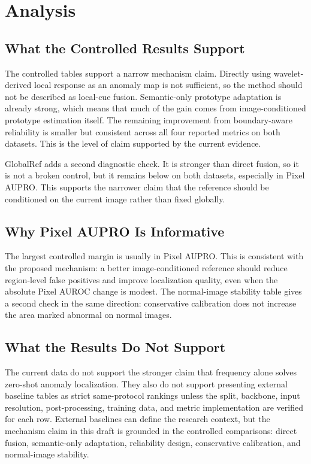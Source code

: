 \section{Analysis}
\label{sec:analysis}

\subsection{What the Controlled Results Support}

The controlled tables support a narrow mechanism claim. Directly using
wavelet-derived local response as an anomaly map is not sufficient, so the
method should not be described as local-cue fusion. Semantic-only prototype
adaptation is already strong, which means that much of the gain comes from
image-conditioned prototype estimation itself. The remaining improvement from
boundary-aware reliability is smaller but consistent across all four reported
metrics on both datasets. This is the level of claim supported by the current
evidence.

GlobalRef adds a second diagnostic check. It is stronger than direct fusion,
so it is not a broken control, but it remains below \method{} on both datasets,
especially in Pixel AUPRO. This supports the narrower claim that the reference
should be conditioned on the current image rather than fixed globally.

\subsection{Why Pixel AUPRO Is Informative}

The largest controlled margin is usually in Pixel AUPRO. This is consistent
with the proposed mechanism: a better image-conditioned reference should reduce
region-level false positives and improve localization quality, even when the
absolute Pixel AUROC change is modest. The normal-image stability table gives a
second check in the same direction: conservative calibration does not increase
the area marked abnormal on normal images.

\subsection{What the Results Do Not Support}

The current data do not support the stronger claim that frequency alone solves
zero-shot anomaly localization. They also do not support presenting external
baseline tables as strict same-protocol rankings unless the split, backbone,
input resolution, post-processing, training data, and metric implementation are
verified for each row. External baselines can define the research context, but
the mechanism claim in this draft is grounded in the controlled comparisons:
direct fusion, semantic-only adaptation, reliability design, conservative
calibration, and normal-image stability.
